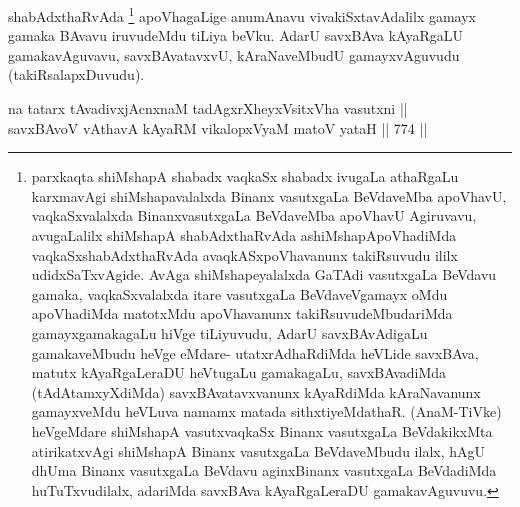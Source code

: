 \begin{artha}
shabAdxthaRvAda \footnote{parxkaqta shiMshapA shabadx vaqkaSx shabadx ivugaLa athaRgaLu karxmavAgi shiMshapavalalxda Binanx vasutxgaLa BeVdaveMba apoVhavU, vaqkaSxvalalxda BinanxvasutxgaLa BeVdaveMba apoVhavU Agiruvavu, avugaLalilx shiMshapA shabAdxthaRvAda ashiMshapApoVhadiMda vaqkaSxshabAdxthaRvAda avaqkASxpoVhavanunx takiRsuvudu ililx udidxSaTxvAgide. AvAga shiMshapeyalalxda GaTAdi vasutxgaLa BeVdavu gamaka, vaqkaSxvalalxda itare vasutxgaLa BeVdaveVgamayx oMdu apoVhadiMda matotxMdu apoVhavanunx takiRsuvudeMbudariMda gamayxgamakagaLu hiVge tiLiyuvudu, AdarU savxBAvAdigaLu gamakaveMbudu heVge eMdare- utatxrAdhaRdiMda heVLide savxBAva, matutx kAyaRgaLeraDU heVtugaLu gamakagaLu, savxBAvadiMda (tAdAtamxyXdiMda) savxBAvatavxvanunx kAyaRdiMda kAraNavanunx gamayxveMdu heVLuva namamx matada sithxtiyeMdathaR. (AnaM-TiVke) heVgeMdare shiMshapA vasutxvaqkaSx Binanx vasutxgaLa BeVdakikxMta atirikatxvAgi shiMshapA Binanx vasutxgaLa BeVdaveMbudu ilalx, hAgU dhUma Binanx vasutxgaLa BeVdavu aginxBinanx vasutxgaLa BeVdadiMda huTuTxvudilalx, adariMda savxBAva kAyaRgaLeraDU gamakavAguvuvu.} apoVhagaLige anumAnavu vivakiSxtavAdalilx gamayx gamaka BAvavu iruvudeMdu tiLiya beVku. AdarU savxBAva kAyaRgaLU gamakavAguvavu, savxBAvatavxvU, kAraNaveMbudU gamayxvAguvudu (takiRsalapxDuvudu).
\end{artha}

\begin{shl}
na tatarx tAvadivxjAcnxnaM tadAgxrXheyxV\s sitxVha vasutxni ||  \\
savxBAvoV vA\s thavA kAyaRM \footnotemark[1]vikalopxV\s yaM matoV yataH \hfill||  774 ||  
\end{shl}

